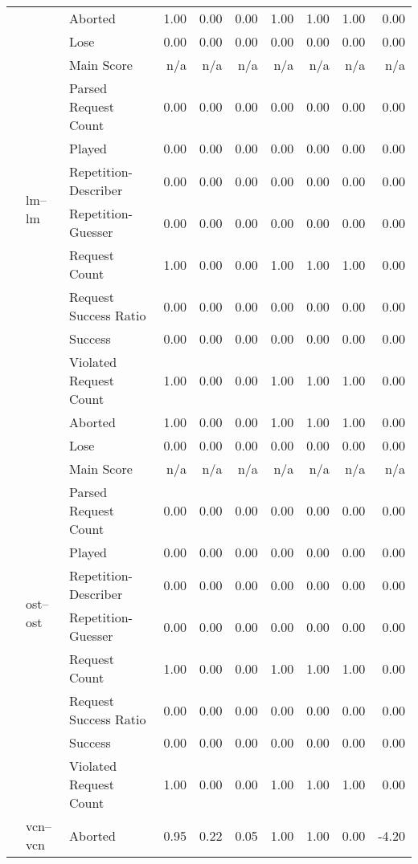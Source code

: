\begin{tabular}{lllrrrrrrr}
\cline{2-10}
 & \multirow[t]{11}{*}{lm--lm} & Aborted & 1.00 & 0.00 & 0.00 & 1.00 & 1.00 & 1.00 & 0.00 \\
 &  & Lose & 0.00 & 0.00 & 0.00 & 0.00 & 0.00 & 0.00 & 0.00 \\
 &  & Main Score & n/a & n/a & n/a & n/a & n/a & n/a & n/a \\
 &  & Parsed Request Count & 0.00 & 0.00 & 0.00 & 0.00 & 0.00 & 0.00 & 0.00 \\
 &  & Played & 0.00 & 0.00 & 0.00 & 0.00 & 0.00 & 0.00 & 0.00 \\
 &  & Repetition-Describer & 0.00 & 0.00 & 0.00 & 0.00 & 0.00 & 0.00 & 0.00 \\
 &  & Repetition-Guesser & 0.00 & 0.00 & 0.00 & 0.00 & 0.00 & 0.00 & 0.00 \\
 &  & Request Count & 1.00 & 0.00 & 0.00 & 1.00 & 1.00 & 1.00 & 0.00 \\
 &  & Request Success Ratio & 0.00 & 0.00 & 0.00 & 0.00 & 0.00 & 0.00 & 0.00 \\
 &  & Success & 0.00 & 0.00 & 0.00 & 0.00 & 0.00 & 0.00 & 0.00 \\
 &  & Violated Request Count & 1.00 & 0.00 & 0.00 & 1.00 & 1.00 & 1.00 & 0.00 \\
\cline{2-10}
 & \multirow[t]{11}{*}{ost--ost} & Aborted & 1.00 & 0.00 & 0.00 & 1.00 & 1.00 & 1.00 & 0.00 \\
 &  & Lose & 0.00 & 0.00 & 0.00 & 0.00 & 0.00 & 0.00 & 0.00 \\
 &  & Main Score & n/a & n/a & n/a & n/a & n/a & n/a & n/a \\
 &  & Parsed Request Count & 0.00 & 0.00 & 0.00 & 0.00 & 0.00 & 0.00 & 0.00 \\
 &  & Played & 0.00 & 0.00 & 0.00 & 0.00 & 0.00 & 0.00 & 0.00 \\
 &  & Repetition-Describer & 0.00 & 0.00 & 0.00 & 0.00 & 0.00 & 0.00 & 0.00 \\
 &  & Repetition-Guesser & 0.00 & 0.00 & 0.00 & 0.00 & 0.00 & 0.00 & 0.00 \\
 &  & Request Count & 1.00 & 0.00 & 0.00 & 1.00 & 1.00 & 1.00 & 0.00 \\
 &  & Request Success Ratio & 0.00 & 0.00 & 0.00 & 0.00 & 0.00 & 0.00 & 0.00 \\
 &  & Success & 0.00 & 0.00 & 0.00 & 0.00 & 0.00 & 0.00 & 0.00 \\
 &  & Violated Request Count & 1.00 & 0.00 & 0.00 & 1.00 & 1.00 & 1.00 & 0.00 \\
\cline{2-10}
 & \multirow[t]{11}{*}{vcn--vcn} & Aborted & 0.95 & 0.22 & 0.05 & 1.00 & 1.00 & 0.00 & -4.20 \\

\end{tabular}
